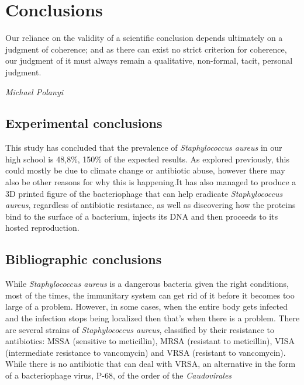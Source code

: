 \chapter{Conclusions}
\epigraph{Our reliance on the validity of a scientific conclusion depends ultimately on a judgment of coherence; and as there can exist no strict criterion for coherence, our judgment of it must always remain a qualitative, non-formal, tacit, personal judgment.}{\textit{Michael Polanyi}}
\section{Experimental conclusions}
This study has concluded that the prevalence of \emph{Staphylococcus aureus} in our high school is 48,8\%, 150\% of the expected results. As explored previously, this could mostly be due to climate change or antibiotic abuse, however there may also be other reasons for why this is happening.\newline It has also managed to produce a 3D printed figure of the bacteriophage that can help eradicate \emph{Staphylococcus aureus}, regardless of antibiotic resistance, as well as discovering how the proteins bind to the surface of a bacterium, injects its DNA and then proceeds to its hosted reproduction.
\section{Bibliographic conclusions}
While \emph{Staphylococcus aureus} is a dangerous bacteria given the right conditions, most of the times, the immunitary system can get rid of it before it becomes too large of a problem. However, in some cases, when the entire body gets infected and the infection stops being localized then that's when there is a problem. There are several strains of \emph{Staphylococcus aureus}, classified by their resistance to antibiotics: MSSA (sensitive to meticillin), MRSA (resistant to meticillin), VISA (intermediate resistance to vancomycin) and VRSA (resistant to vancomycin). While there is no antibiotic that can deal with VRSA, an alternative in the form of a bacteriophage virus, P-68, of the order of the \emph{Caudovirales}
